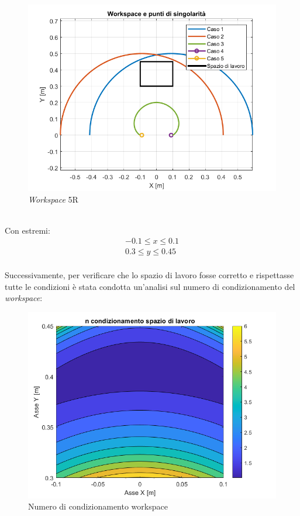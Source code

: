 \begin{figure}[ht]
	\begin{center}
		\includegraphics[scale=0.55]{Immagini/Singolarity/WorksingNew}
		\caption{\textit{Workspace} 5R}
	\end{center}
\end{figure}
\\Con estremi:
\begin{equation*}
	\begin{split}
		-0.1 \le x \le 0.1 \\
		0.3 \le y \le 0.45
	\end{split}
\end{equation*}
\\Successivamente, per verificare che lo spazio di lavoro fosse corretto e rispettasse tutte le condizioni è stata condotta un'analisi sul numero di condizionamento del \textit{workspace}:
\begin{figure}[ht]
	\begin{center}
		\includegraphics[scale=0.55]{Immagini/Singolarity/ncondsl}
		\caption{Numero di condizionamento workspace}
	\end{center}
\end{figure}
